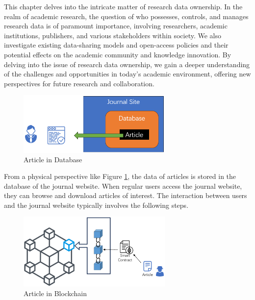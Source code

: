 \documentclass[lettersize,journal]{IEEEtran}
\begin{document}
This chapter delves into the intricate matter of research data ownership. In the realm of academic research, the question of who possesses, controls, and manages research data is of paramount importance, involving researchers, academic institutions, publishers, and various stakeholders within society. We also investigate existing data-sharing models and open-access policies and their potential effects on the academic community and knowledge innovation. By delving into the issue of research data ownership, we gain a deeper understanding of the challenges and opportunities in today's academic environment, offering new perspectives for future research and collaboration.

\begin{figure}[h]
  \centering
  \includegraphics[width=3in]{assets/journalsite.png}
  \caption{Article in Database}
  \label{fig:journalsite}
\end{figure}

From a physical perspective like Figure \ref{fig:journalsite}, the data of articles is stored in the database of the journal website. When regular users access the journal website, they can browse and download articles of interest. The interaction between users and the journal website typically involves the following steps.


\begin{figure}[h]
  \centering
  \includegraphics[width=3in]{assets/journalchain.png}
  \caption{Article in Blockchain}
  \label{fig:journalchain}
\end{figure}
\end{document}
